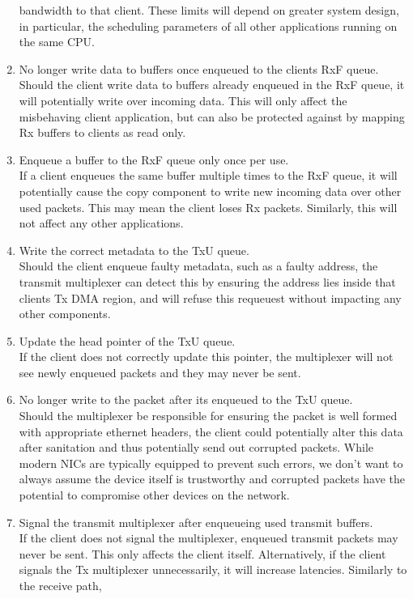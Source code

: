 \begin{enumerate}
    bandwidth to that client. These limits
    will depend on greater system design, in particular, the scheduling parameters of all other applications running on the same CPU.
    \item No longer write data to buffers once enqueued to the clients RxF queue.\\
    Should the client write data to buffers already enqueued in the RxF queue, it will potentially write over incoming data. This will only
    affect the misbehaving client application, but can also be protected against by mapping Rx buffers to clients as read only.
    \item Enqueue a buffer to the RxF queue only once per use.\\
    If a client enqueues the same buffer multiple times to the RxF queue, it will potentially cause the copy component to write new incoming
    data over other used packets. This may mean the client loses Rx packets. Similarly, this will not affect any other applications.
    \item Write the correct metadata to the TxU queue.\\
    Should the client enqueue faulty metadata, such as a faulty address, the transmit multiplexer can detect this by ensuring the address lies inside
    that clients Tx DMA region, and will refuse this requeuest without impacting any other components.
    \item Update the head pointer of the TxU queue.\\
    If the client does not correctly update this pointer, the multiplexer will not see newly enqueued packets and they may never be sent.
    \item No longer write to the packet after its enqueued to the TxU queue.\\
    Should the multiplexer be responsible for ensuring the packet is well formed with appropriate ethernet headers, the client could potentially
    alter this data after sanitation and thus potentially send out corrupted packets. While modern NICs are typically equipped to prevent
    such errors, we don't want to always assume the device itself is trustworthy and corrupted packets have the potential to compromise
    other devices on the network.
    \item Signal the transmit multiplexer after enqueueing used transmit buffers.\\
    If the client does not signal the multiplexer, enqueued transmit packets may never be sent. This only affects the client itself.
    Alternatively, if the client signals the Tx multiplexer unnecessarily, it will increase latencies. Similarly to the receive path,

\end{enumerate}
